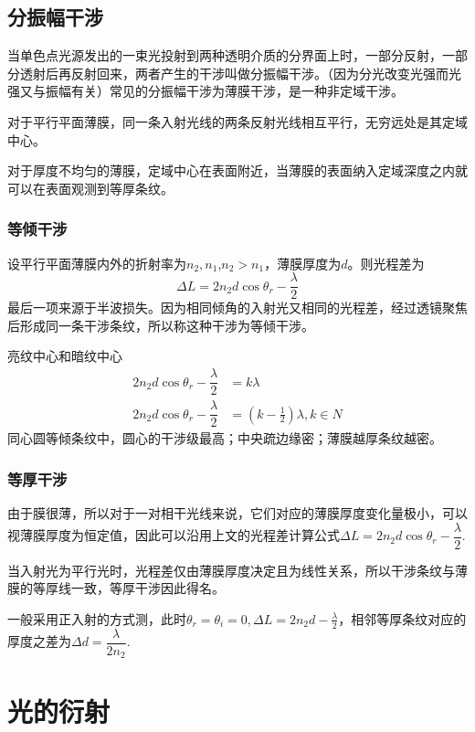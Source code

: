 \subsection{分振幅干涉}
当单色点光源发出的一束光投射到两种透明介质的分界面上时，一部分反射，一部分透射后再反射回来，两者产生的干涉叫做分振幅干涉。（因为分光改变光强而光强又与振幅有关）常见的分振幅干涉为薄膜干涉，是一种非定域干涉。

对于平行平面薄膜，同一条入射光线的两条反射光线相互平行，无穷远处是其定域中心。

对于厚度不均匀的薄膜，定域中心在表面附近，当薄膜的表面纳入定域深度之内就可以在表面观测到等厚条纹。

\subsubsection{等倾干涉}
设平行平面薄膜内外的折射率为$n_2,n_1$,$n_2>n_1$，薄膜厚度为$d$。则光程差为
\begin{equation}
    \Delta L=2n_2 d \cos \theta_r -\dfrac{\lambda}{2}
\end{equation}
最后一项来源于半波损失。因为相同倾角的入射光又相同的光程差，经过透镜聚焦后形成同一条干涉条纹，所以称这种干涉为等倾干涉。

亮纹中心和暗纹中心
\begin{align}
    2n_2 d \cos \theta_r -\dfrac{\lambda}{2}&=k\lambda\\
    2n_2 d \cos \theta_r -\dfrac{\lambda}{2}&=(k-\frac{1}{2})\lambda,k\in N
\end{align}
同心圆等倾条纹中，圆心的干涉级最高；中央疏边缘密；薄膜越厚条纹越密。
\subsubsection{等厚干涉}
由于膜很薄，所以对于一对相干光线来说，它们对应的薄膜厚度变化量极小，可以视薄膜厚度为恒定值，因此可以沿用上文的光程差计算公式$\Delta L=2n_2 d \cos \theta _r -\dfrac{\lambda}{2}$.

当入射光为平行光时，光程差仅由薄膜厚度决定且为线性关系，所以干涉条纹与薄膜的等厚线一致，等厚干涉因此得名。

一般采用正入射的方式测，此时$\theta_r=\theta_i=0,\Delta L=2n_2 d -\frac{\lambda}{2}$，相邻等厚条纹对应的厚度之差为$\Delta d=\dfrac{\lambda}{2n_2}$.
\section{光的衍射}
